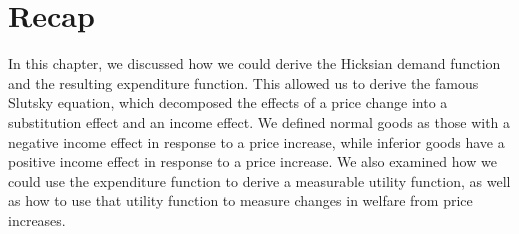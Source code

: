 \section*{Recap}
In this chapter, we discussed how we could derive the Hicksian demand function and the resulting expenditure function. This allowed us to derive the famous Slutsky equation, which decomposed the effects of a price change into a substitution effect and an income effect. We defined normal goods as those with a negative income effect in response to a price increase, while inferior goods have a positive income effect in response to a price increase. We also examined how we could use the expenditure function to derive a measurable utility function, as well as how to use that utility function to measure changes in welfare from price increases. 